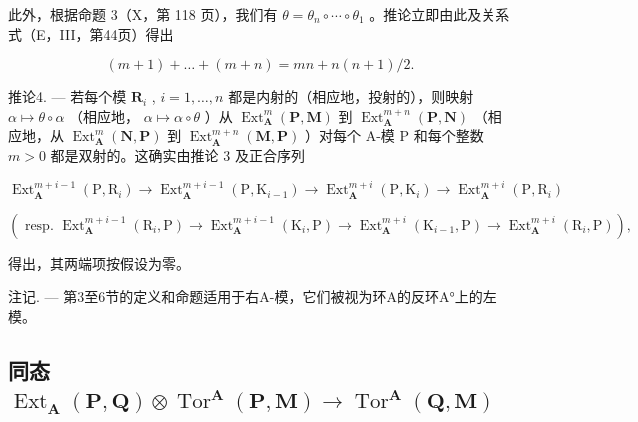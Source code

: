 此外，根据命题 3（X，第 118 页），我们有 \(\theta = \theta_{n} \circ \cdots \circ \theta_{1}\) 。推论立即由此及关系式（E，III，第44页）得出

\[
(m + 1) + \dots + (m + n) = m n + n (n + 1) / 2.
\]

推论4. --- 若每个模 \(\mathbf{R}_i\) , \(i = 1, \ldots, n\) 都是内射的（相应地，投射的），则映射 \(\alpha \mapsto \theta \circ \alpha\) （相应地， \(\alpha \mapsto \alpha \circ \theta\) ）从 \(\operatorname{Ext}_{\mathbf{A}}^{m}(\mathbf{P}, \mathbf{M})\) 到 \(\operatorname{Ext}_{\mathbf{A}}^{m+n}(\mathbf{P}, \mathbf{N})\) （相应地，从 \(\operatorname{Ext}_{\mathbf{A}}^{m}(\mathbf{N}, \mathbf{P})\) 到 \(\operatorname{Ext}_{\mathbf{A}}^{m+n}(\mathbf{M}, \mathbf{P})\) ）对每个 A-模 P 和每个整数 \(m > 0\) 都是双射的。这确实由推论 3 及正合序列

\[
\operatorname{Ext} _ {\mathbf {A}} ^ {m + i - 1} \left(\mathrm{P}, \mathrm{R} _ {i}\right)\rightarrow \operatorname{Ext} _ {\mathbf {A}} ^ {m + i - 1} \left(\mathrm{P}, \mathrm{K} _ {i - 1}\right)\rightarrow \operatorname{Ext} _ {\mathbf {A}} ^ {m + i} \left(\mathrm{P}, \mathrm{K} _ {i}\right)\rightarrow \operatorname{Ext} _ {\mathbf {A}} ^ {m + i} \left(\mathrm{P}, \mathrm{R} _ {i}\right)
\]

\[
\left(\text { resp. } \operatorname{Ext} _ {\mathbf {A}} ^ {m + i - 1} \left(\mathrm{R} _ {i}, \mathrm{P}\right)\rightarrow \operatorname{Ext} _ {\mathbf {A}} ^ {m + i - 1} \left(\mathrm{K} _ {i}, \mathrm{P}\right)\rightarrow \operatorname{Ext} _ {\mathbf {A}} ^ {m + i} \left(\mathrm{K} _ {i - 1}, \mathrm{P}\right)\rightarrow \operatorname{Ext} _ {\mathbf {A}} ^ {m + i} \left(\mathrm{R} _ {i}, \mathrm{P}\right)\right),
\]

得出，其两端项按假设为零。

注记. --- 第3至6节的定义和命题适用于右A-模，它们被视为环A的反环A°上的左模。

\subsection{\texorpdfstring{同态 \(\operatorname{Ext}_{\mathbf{A}}(\mathbf{P}, \mathbf{Q}) \otimes \operatorname{Tor}^{\mathbf{A}}(\mathbf{P}, \mathbf{M}) \to \operatorname{Tor}^{\mathbf{A}}(\mathbf{Q}, \mathbf{M})\)}{同态 \textbackslash operatorname\{Ext\}\_\{\textbackslash mathbf\{A\}\}(\textbackslash mathbf\{P\}, \textbackslash mathbf\{Q\}) \textbackslash otimes \textbackslash operatorname\{Tor\}\^{}\{\textbackslash mathbf\{A\}\}(\textbackslash mathbf\{P\}, \textbackslash mathbf\{M\}) \textbackslash 到 \textbackslash operatorname\{Tor\}\^{}\{\textbackslash mathbf\{A\}\}(\textbackslash mathbf\{Q\}, \textbackslash mathbf\{M\})}}

